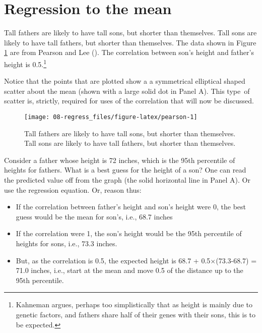 \documentclass[
  10ptls,
  b5paper]{book}
\providecommand{\tightlist}{%
  \setlength{\itemsep}{0pt}\setlength{\parskip}{0pt}}
\begin{document}
\section{Regression to the mean}\label{regression-to-the-mean}

Tall fathers are likely to have tall sons, but shorter than themselves. Tall sons are likely to have tall fathers, but shorter than themselves. The data shown in Figure \ref{fig:pearson} are from Pearson and Lee (). The correlation between son's height and father's height is 0.5.\footnote{Kahneman argues, perhaps too simplistically that as height is mainly due to genetic factors, and fathers share half of their genes with their sons, this is to be expected.}

Notice that the points that are plotted show a a symmetrical elliptical shaped scatter about the mean (shown with a large solid dot in Panel A). This type~of scatter is, strictly, required for uses of the correlation that will now be discussed.

\begin{figure}[H]

{\centering \texttt{[image: 08-regress\_files/figure-latex/pearson-1]} 

}

\caption{Tall fathers are likely to have tall sons, but shorter than themselves. 
Tall sons are likely to have tall fathers, but shorter than themselves.}\label{fig:pearson}
\end{figure}

Consider a father whose height is 72 inches, which is the 95th percentile of heights for fathers. What is a best guess for the height of a son? One can read the predicted value off from the graph (the solid horizontal line in Panel A). Or use the regression equation. Or, reason thus:

\begin{itemize}
\tightlist
\item
  If the correlation between father's height and son's height were 0, the best guess would be the mean for son's, i.e., 68.7 inches
\item
  If the correlation were 1, the son's height would be the 95th percentile of heights for sons, i.e., 73.3 inches.
\item
  But, as the correlation is 0.5, the expected height is 68.7 + 0.5\(\times\)(73.3-68.7) = 71.0 inches, i.e., start at the mean and move 0.5 of the distance up to the 95th percentile.
\end{itemize}
\end{document}
